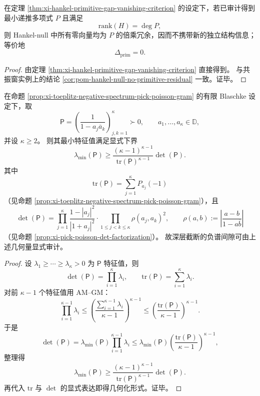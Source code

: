 \begin{corollary}\label{cor:xi-hankel-null-extra-vectors-one-step-criterion}
在定理 \ref{thm:xi-hankel-primitive-gap-vanishing-criterion} 的设定下，若已审计得到最小递推多项式 \(P\) 且满足
\[
\mathrm{rank}(H)=\deg P,
\]
则 Hankel-null 中所有零向量均为 \(P\) 的倍乘冗余，因而不携带新的独立结构信息；等价地
\[
\Delta_{\mathrm{prim}}=0.
\]
\end{corollary}
\begin{proof}
由定理 \ref{thm:xi-hankel-primitive-gap-vanishing-criterion} 直接得到。
与共振窗实例上的结论 \ref{cor:pom-hankel-null-no-primitive-residual} 一致。证毕。
\end{proof}

\begin{theorem}\label{thm:xi-deep-toeplitz-negative-gap-det-tr-geometry}
在命题 \ref{prop:xi-toeplitz-negative-spectrum-pick-poisson-gram} 的有限 Blaschke 设定下，取
\[
\mathsf P=\left(\frac{1}{1-a_j\overline a_k}\right)_{j,k=1}^{\kappa}\succ0,
\qquad a_1,\dots,a_\kappa\in\mathbb D,
\]
并设 \(\kappa\ge 2\)。
则其最小特征值满足显式下界
\[
\lambda_{\min}(\mathsf P)
\ge
\frac{(\kappa-1)^{\kappa-1}}{\mathrm{tr}(\mathsf P)^{\kappa-1}}\det(\mathsf P).
\]
其中
\[
\mathrm{tr}(\mathsf P)=\sum_{j=1}^{\kappa}P_{a_j}(-1)
\]
（见命题 \ref{prop:xi-toeplitz-negative-spectrum-pick-poisson-gram}），且
\[
\det(\mathsf P)
=
\prod_{j=1}^{\kappa}\frac{1-|a_j|^2}{|1+a_j|^2}
\cdot
\prod_{1\le j<k\le \kappa}\rho(a_j,a_k)^2,
\qquad
\rho(a,b):=\left|\frac{a-b}{1-a\overline b}\right|
\]
（见命题 \ref{prop:xi-pick-poisson-det-factorization}）。
故深层截断的负谱间隙可由上述几何量显式审计。
\end{theorem}
\begin{proof}
设 \(\lambda_1\ge\cdots\ge\lambda_\kappa>0\) 为 \(\mathsf P\) 特征值，则
\[
\det(\mathsf P)=\prod_{i=1}^{\kappa}\lambda_i,\qquad
\mathrm{tr}(\mathsf P)=\sum_{i=1}^{\kappa}\lambda_i.
\]
对前 \(\kappa-1\) 个特征值用 AM--GM：
\[
\prod_{i=1}^{\kappa-1}\lambda_i
\le
\left(\frac{\sum_{i=1}^{\kappa-1}\lambda_i}{\kappa-1}\right)^{\kappa-1}
\le
\left(\frac{\mathrm{tr}(\mathsf P)}{\kappa-1}\right)^{\kappa-1}.
\]
于是
\[
\det(\mathsf P)
=\lambda_{\min}(\mathsf P)\prod_{i=1}^{\kappa-1}\lambda_i
\le
\lambda_{\min}(\mathsf P)\left(\frac{\mathrm{tr}(\mathsf P)}{\kappa-1}\right)^{\kappa-1},
\]
整理得
\[
\lambda_{\min}(\mathsf P)\ge
\frac{(\kappa-1)^{\kappa-1}}{\mathrm{tr}(\mathsf P)^{\kappa-1}}\det(\mathsf P).
\]
再代入 \(\mathrm{tr}\) 与 \(\det\) 的显式表达即得几何化形式。证毕。
\end{proof}

